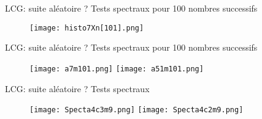\begin{frame}{LCG: suite aléatoire ?}
    Tests spectraux pour 100 nombres successifs
      \begin{figure}
        \begin{center}
        \texttt{[image: histo7Xn[101].png]}
        \end{center}
      \end{figure}
  \end{frame}
  
  \begin{frame}{LCG: suite aléatoire ?}
    Tests spectraux pour 100 nombres successifs
      \begin{figure}
        \begin{center}
        \texttt{[image: a7m101.png]}
        \hspace{0.1\textwidth}
        \texttt{[image: a51m101.png]}
        \end{center}
      \end{figure}
  \end{frame}
  
  \begin{frame}{LCG: suite aléatoire ?}
    Tests spectraux
      \begin{figure}
        \begin{center}
        \texttt{[image: Specta4c3m9.png]}
        \hspace{0.1\textwidth}
        \texttt{[image: Specta4c2m9.png]}
        \end{center}
      \end{figure}
  \end{frame}
  